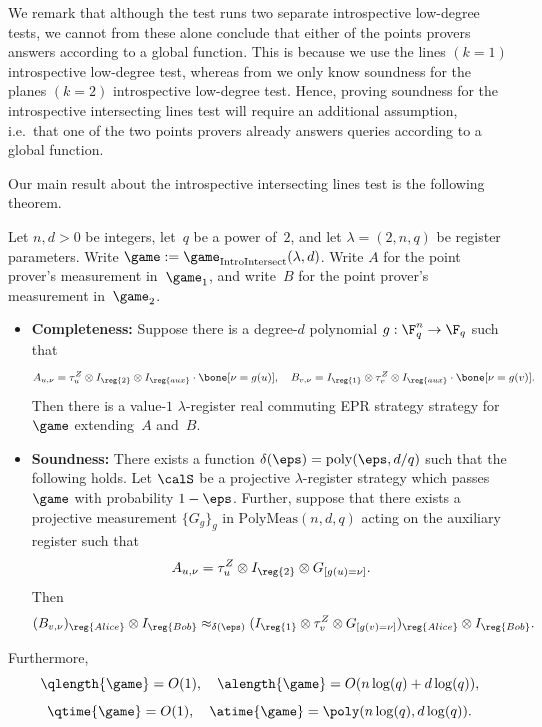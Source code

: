 \begin{remark}
We remark that although the test runs two separate introspective low-degree tests,
we cannot from these alone conclude that either of the points provers answers according to a global function.
This is because we use the lines $(k=1)$ introspective low-degree test,
whereas from  we only know soundness for the planes $(k=2)$ introspective low-degree test.
Hence, proving soundness for the introspective intersecting lines test will require an additional assumption,
i.e.\ that one of the two points provers already answers queries according to a global function.
\end{remark}

Our main result about the introspective intersecting lines test is the following theorem.

\begin{theorem}\label{thm:big-transfer}
Let $n, d> 0$ be integers, let~$q$ be a power of~$2$, and let $\lambda = (2, n, q)$ be register parameters.
Write $\game := \game_{\mathrm{IntroIntersect}}(\lambda, d)$.
Write $A$ for the point prover's measurement in~$\game_1$,
and write~$B$ for the point prover's measurement in~$\game_2$.
\begin{itemize}
\item[$\circ$] \textbf{Completeness:}
		Suppose there is a degree-$d$ polynomial $g:\F_q^{n}\rightarrow \F_q$ such that
		\begin{equation*}
			A_{u, \nu} = \tau_u^Z \otimes I_{\reg{2}} \otimes I_{\reg{aux}} \cdot \bone[\nu = g(u)],
			\quad
			B_{v, \nu} = I_{\reg{1}} \otimes \tau_v^Z \otimes I_{\reg{aux}} \cdot \bone[\nu = g(v)].
		\end{equation*}
		Then there is a value-$1$ $\lambda$-register real commuting EPR strategy strategy for $\game$
		extending~$A$ and~$B$.
\item[$\circ$] \textbf{Soundness:}
		There exists a function $\delta(\eps) = \mathrm{poly}(\eps, d/q)$ such that the following holds.
		Let $\calS$ be a projective $\lambda$-register strategy which passes~$\game$ with probability $1-\eps$.
		Further, suppose that there exists a projective measurement
		$\{G_g\}_g$ in $\mathrm{PolyMeas}(n, d, q)$ acting on the auxiliary register such that
		\begin{equation*}
		A_{u, \nu} = \tau_u^Z \otimes I_{\reg{2}} \otimes G_{[g(u)= \nu]}.
		\end{equation*}
		Then
		\begin{equation*}
		(B_{v, \nu})_{\reg{Alice}} \otimes I_{\reg{Bob}}
			\approx_{\delta(\eps)} (I_{\reg{1}} \otimes \tau_v^Z \otimes G_{[g(v)=\nu]} )_{\reg{Alice}}\otimes I_{\reg{Bob}}.
		\end{equation*}
\end{itemize}
Furthermore,
\begin{equation*}
\qlength{\game} = O(1), \quad
\alength{\game} = O(n \log(q) + d \log(q)),
\end{equation*}
\begin{equation*}
\qtime{\game} = O(1), \quad
\atime{\game} = \poly(n \log(q), d \log(q)).
\end{equation*}
\end{theorem}


